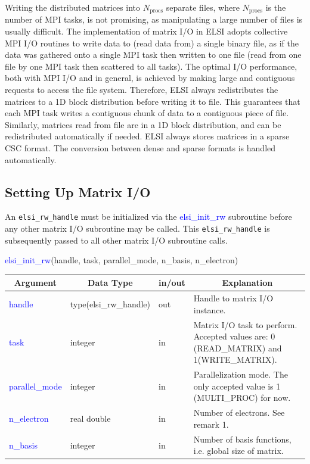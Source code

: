 \documentclass{report}
\newcommand{\tcb}[1]{\textcolor{blue}{#1}}
\begin{document}
Writing the distributed matrices into $N_\text{procs}$ separate files, where $N_\text{procs}$ is the number of MPI tasks, is not promising, as manipulating a large number of files is usually difficult. The implementation of matrix I/O in ELSI adopts collective MPI I/O routines to write data to (read data from) a single binary file, as if the data was gathered onto a single MPI task then written to one file (read from one file by one MPI task then scattered to all tasks). The optimal I/O performance, both with MPI I/O and in general, is achieved by making large and contiguous requests to access the file system. Therefore, ELSI always redistributes the matrices to a 1D block distribution before writing it to file. This guarantees that each MPI task writes a contiguous chunk of data to a contiguous piece of file. Similarly, matrices read from file are in a 1D block distribution, and can be redistributed automatically if needed. ELSI always stores matrices in a sparse CSC format. The conversion between dense and sparse formats is handled automatically.

\subsection{Setting Up Matrix I/O}
\label{subsec:rw_init}
An \texttt{elsi\_rw\_handle} must be initialized via the \tcb{elsi\_init\_rw} subroutine before any other matrix I/O subroutine may be called. This \texttt{elsi\_rw\_handle} is subsequently passed to all other matrix I/O subroutine calls.

\begin{labeling}{\hspace{6cm}}
\item [\hspace{0.3cm} \tcb{elsi\_init\_rw}(handle, task, parallel\_mode, n\_basis, n\_electron)]
\end{labeling}

\begin{tabular}[]{|p{20mm}|p{45mm}|p{15mm}|p{85mm}|}
\hline
\multicolumn{1}{|c|}{\textbf{Argument}} & \multicolumn{1}{c|}{\textbf{Data Type}} & \multicolumn{1}{c|}{\textbf{in/out}} & \multicolumn{1}{c|}{\textbf{Explanation}}\\
\hline
\tcb{handle}         & type(elsi\_rw\_handle) & out & Handle to matrix I/O instance.\\
\hline
\tcb{task}           & integer                & in  & Matrix I/O task to perform. Accepted values are: 0 (READ\_MATRIX) and 1(WRITE\_MATRIX).\\
\hline
\tcb{parallel\_mode} & integer                & in  & Parallelization mode. The only accepted value is 1 (MULTI\_PROC) for now.\\
\hline
\tcb{n\_electron}    & real double            & in  & Number of electrons. See remark 1.\\
\hline
\tcb{n\_basis}       & integer                & in  & Number of basis functions, i.e. global size of matrix.\\
\hline
\end{tabular}
\end{document}
